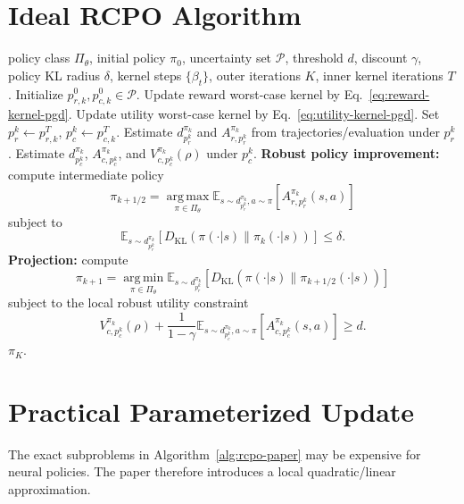 \documentclass[11pt]{article}
\newcommand{\Pset}{\mathcal P}
\newcommand{\E}{\mathbb E}
\newcommand{\KL}{D_{\mathrm{KL}}}
\newcommand{\argmax}{\operatorname*{arg\,max}}
\newcommand{\argmin}{\operatorname*{arg\,min}}
\begin{document}
\section{Ideal RCPO Algorithm}
\begin{algorithm}[H]
\caption{Robust Constrained Policy Optimization (paper-level algorithm)}
\label{alg:rcpo-paper}
\begin{algorithmic}[1]
\Require policy class $\Pi_\theta$, initial policy $\pi_0$, uncertainty set $\Pset$, threshold $d$, discount $\gamma$, policy KL radius $\delta$, kernel steps $\{\beta_t\}$, outer iterations $K$, inner kernel iterations $T$.
    \State Initialize $p_{r,k}^0,p_{c,k}^0\in\Pset$.
        \State Update reward worst-case kernel by Eq.~\eqref{eq:reward-kernel-pgd}.
        \State Update utility worst-case kernel by Eq.~\eqref{eq:utility-kernel-pgd}.
    \EndFor
    \State Set $p_r^k\gets p_{r,k}^T$, $p_c^k\gets p_{c,k}^T$.
    \State Estimate $d_{p_r^k}^{\pi_k}$ and $A^{\pi_k}_{r,p_r^k}$ from trajectories/evaluation under $p_r^k$.
    \State Estimate $d_{p_c^k}^{\pi_k}$, $A^{\pi_k}_{c,p_c^k}$, and $V^{\pi_k}_{c,p_c^k}(\rho)$ under $p_c^k$.
    \State \textbf{Robust policy improvement:} compute intermediate policy
    \begin{equation*}
        \pi_{k+1/2}=\argmax_{\pi\in\Pi_\theta}
        \E_{s\sim d_{p_r^k}^{\pi_k},a\sim\pi}\left[A^{\pi_k}_{r,p_r^k}(s,a)\right]
    \end{equation*}
    subject to
    \begin{equation*}
        \E_{s\sim d_{p_r^k}^{\pi_k}}\left[\KL(\pi(\cdot|s)\|\pi_k(\cdot|s))\right]\le\delta.
    \end{equation*}
    \State \textbf{Projection:} compute
    \begin{equation*}
        \pi_{k+1}=\argmin_{\pi\in\Pi_\theta}
        \E_{s\sim d_{p_r^k}^{\pi_k}}\left[\KL(\pi(\cdot|s)\|\pi_{k+1/2}(\cdot|s))\right]
    \end{equation*}
    subject to the local robust utility constraint
    \begin{equation*}
        V^{\pi_k}_{c,p_c^k}(\rho)
        +\frac{1}{1-\gamma}\E_{s\sim d_{p_c^k}^{\pi_k},a\sim\pi}
        \left[A^{\pi_k}_{c,p_c^k}(s,a)\right]
        \ge d.
    \end{equation*}
\EndFor
\State \Return $\pi_K$.
\end{algorithmic}
\end{algorithm}

\section{Practical Parameterized Update}
The exact subproblems in Algorithm~\ref{alg:rcpo-paper} may be expensive for neural policies.  The paper therefore introduces a local quadratic/linear approximation.
\end{document}
